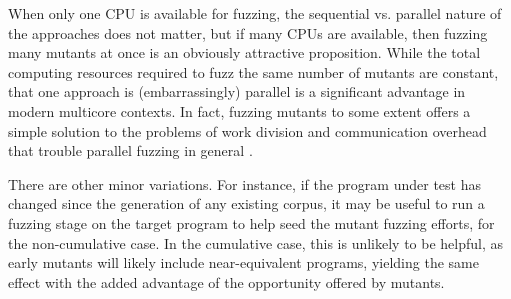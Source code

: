 When only one CPU is available for fuzzing, the sequential vs. parallel nature of the approaches does not matter, but if many CPUs are available, then fuzzing many mutants at once is an obviously attractive proposition.  While the total computing resources required to fuzz the same number of mutants are constant, that one approach is (embarrassingly) parallel is a significant advantage in modern multicore contexts.  In fact, fuzzing mutants to some extent offers a simple solution to the problems of work division and communication overhead that trouble parallel fuzzing in general \cite{wang2021facilitating}.

There are other minor variations.  For instance, if the program under
test has changed since the generation of any existing corpus, it may
be useful to run a fuzzing stage on the target program to help seed
the mutant fuzzing efforts, for the non-cumulative case.  In the
cumulative case, this is unlikely to be helpful, as early mutants will
likely include near-equivalent programs, yielding the same effect with the added advantage of the opportunity offered by mutants.
